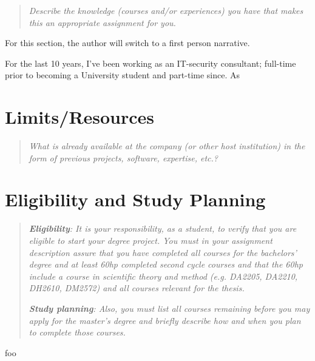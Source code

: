\documentclass[12pt, a4paper]{article}
\begin{document}
\begin{quote}
	\textit{Describe the knowledge (courses and/or experiences) you have that makes this an appropriate assignment for you.}
\end{quote}

For this section, the author will switch to a first person narrative.

For the last 10 years, I've been working as an IT-security consultant; full-time prior to becoming a University student and part-time since. As

\section{Limits/Resources}

\begin{quote}
	\textit{What is already available at the company (or other host institution) in the form of previous projects, software, expertise, etc.?}
\end{quote}



\section{Eligibility and Study Planning}

\begin{quote}
	\textit{\textbf{Eligibility}: It is your responsibility, as a student, to verify that you are eligible to start your degree project. You must in your assignment description assure that you have completed all courses for the bachelors' degree and at least 60hp completed second cycle courses and that the 60hp include a course in scientific theory and method (e.g. DA2205, DA2210, DH2610, DM2572) and all courses relevant for the thesis.}

	\textit{\textbf{Study planning}: Also, you must list all courses remaining before you may apply for the master's degree and briefly describe how and when you plan to complete those courses.}
\end{quote}



foo \cite{evaluation_of_irs}






%
\end{document}
